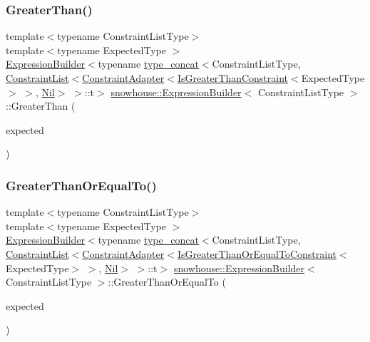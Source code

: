\subsubsection{\texorpdfstring{GreaterThan()}{GreaterThan()}}
{\footnotesize\ttfamily template$<$typename Constraint\+List\+Type$>$ \\
template$<$typename Expected\+Type $>$ \\
\mbox{\hyperlink{structsnowhouse_1_1ExpressionBuilder}{Expression\+Builder}}$<$typename \mbox{\hyperlink{structsnowhouse_1_1type__concat}{type\+\_\+concat}}$<$Constraint\+List\+Type, \mbox{\hyperlink{structsnowhouse_1_1ConstraintList}{Constraint\+List}}$<$\mbox{\hyperlink{structsnowhouse_1_1ConstraintAdapter}{Constraint\+Adapter}}$<$\mbox{\hyperlink{structsnowhouse_1_1IsGreaterThanConstraint}{Is\+Greater\+Than\+Constraint}}$<$Expected\+Type$>$ $>$, \mbox{\hyperlink{structsnowhouse_1_1Nil}{Nil}}$>$ $>$\+::t$>$ \mbox{\hyperlink{structsnowhouse_1_1ExpressionBuilder}{snowhouse\+::\+Expression\+Builder}}$<$ Constraint\+List\+Type $>$\+::Greater\+Than (\begin{DoxyParamCaption}\item[{const Expected\+Type \&}]{expected }\end{DoxyParamCaption})\hspace{0.3cm}{\ttfamily [inline]}}

\mbox{\label{structsnowhouse_1_1ExpressionBuilder_aa90fe0955f1e2b31080709c41f682726}} 
\subsubsection{\texorpdfstring{GreaterThanOrEqualTo()}{GreaterThanOrEqualTo()}}
{\footnotesize\ttfamily template$<$typename Constraint\+List\+Type$>$ \\
template$<$typename Expected\+Type $>$ \\
\mbox{\hyperlink{structsnowhouse_1_1ExpressionBuilder}{Expression\+Builder}}$<$typename \mbox{\hyperlink{structsnowhouse_1_1type__concat}{type\+\_\+concat}}$<$Constraint\+List\+Type, \mbox{\hyperlink{structsnowhouse_1_1ConstraintList}{Constraint\+List}}$<$\mbox{\hyperlink{structsnowhouse_1_1ConstraintAdapter}{Constraint\+Adapter}}$<$\mbox{\hyperlink{structsnowhouse_1_1IsGreaterThanOrEqualToConstraint}{Is\+Greater\+Than\+Or\+Equal\+To\+Constraint}}$<$Expected\+Type$>$ $>$, \mbox{\hyperlink{structsnowhouse_1_1Nil}{Nil}}$>$ $>$\+::t$>$ \mbox{\hyperlink{structsnowhouse_1_1ExpressionBuilder}{snowhouse\+::\+Expression\+Builder}}$<$ Constraint\+List\+Type $>$\+::Greater\+Than\+Or\+Equal\+To (\begin{DoxyParamCaption}\item[{const Expected\+Type \&}]{expected }\end{DoxyParamCaption})\hspace{0.3cm}{\ttfamily [inline]}}

